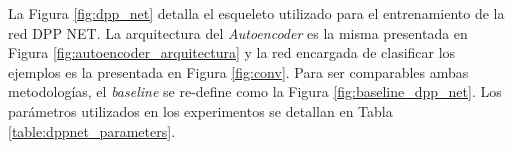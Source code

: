 La Figura \ref{fig:dpp_net} detalla el esqueleto utilizado para el entrenamiento de la red DPP NET. La arquitectura del \textit{Autoencoder} es la misma presentada en Figura \ref{fig:autoencoder_arquitectura} y la red encargada de clasificar los ejemplos es la presentada en Figura \ref{fig:conv}. Para ser comparables ambas metodologías, el \textit{baseline} se re-define como la Figura \ref{fig:baseline_dpp_net}. Los parámetros utilizados en los experimentos se detallan en Tabla \ref{table:dppnet_parameters}.

